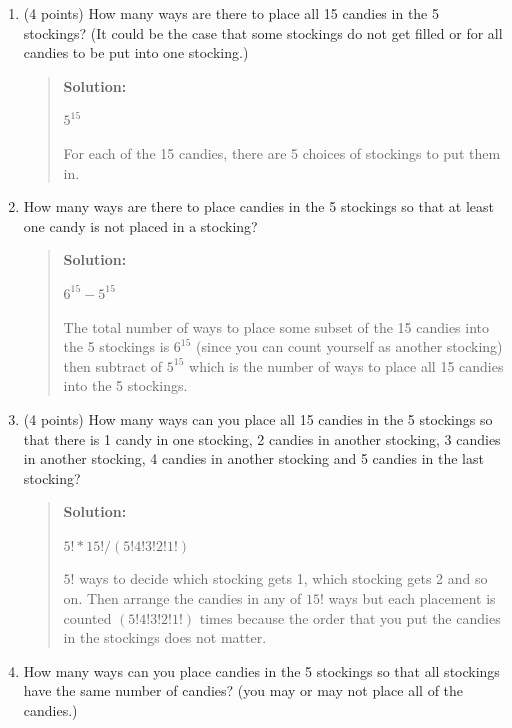 \documentclass[10pt,letterpaper,unboxed,cm]{article}
\begin{document}
\begin{enumerate}
\begin{enumerate}



\item (4 points)
How many ways are there to place all 15 candies in the 5 stockings?
(It could be the case that some stockings do not get filled or for all candies to be put into one stocking.)

\begin{quote}
{\bf Solution:}

$5^{15}$

For each of the 15 candies, there are 5 choices of stockings to put them in.
\end{quote}



\item 
How many ways are there to place candies in the 5 stockings so that at least one candy is not placed in a stocking?

\begin{quote}
{\bf Solution:}

$6^{15}-5^{15}$

The total number of ways to place some subset of the 15 candies into the 5 stockings is $6^{15}$ (since you can count yourself as another stocking) then subtract of $5^{15}$ which is the number of ways to place all 15 candies into the 5 stockings.
\end{quote}



\item (4 points)
How many ways can you place all 15 candies in the 5 stockings so that there is 1 candy in one stocking, 2 candies in another stocking, 3 candies in another stocking, 4 candies in another stocking and 5 candies in the last stocking?

\begin{quote}
{\bf Solution:}

$5!*15!/(5!4!3!2!1!)$

$5!$ ways to decide which stocking gets 1, which stocking gets 2 and so on. Then arrange the candies in any of $15!$ ways but each placement is counted $(5!4!3!2!1!)$ times because the order that you put the candies in the stockings does not matter.

\end{quote}



\item 
How many ways can you place candies in the 5 stockings so that all stockings have the same number of candies? (you may or may not place all of the candies.)


\end{enumerate}
\end{enumerate}
\end{document}
